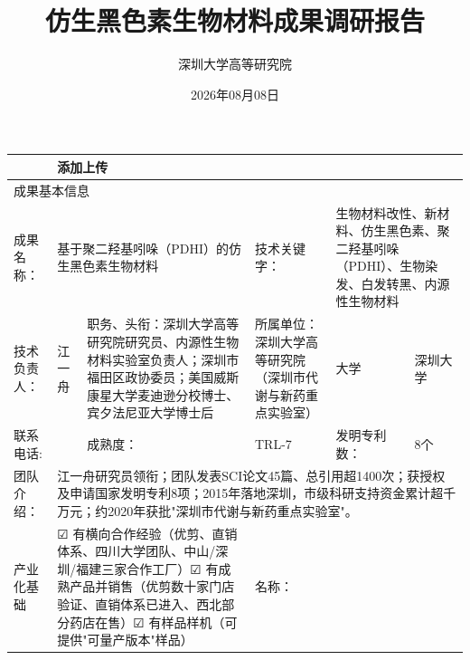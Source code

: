 \documentclass[nomath]{harryopo-paper}
\title{仿生黑色素生物材料成果调研报告}
\author{深圳大学高等研究院}
\date{2026年08月08日}
\begin{document}
\maketitle

\newlength{\cellw}
\setlength{\cellw}{\dimexpr\dimexpr\textwidth-14\tabcolsep-7\arrayrulewidth-1pt\relax/6\relax}
\begin{longtable}{|p{\dimexpr\dimexpr\textwidth-14\tabcolsep-7\arrayrulewidth-1pt\relax/6\relax}|p{\dimexpr\dimexpr\textwidth-14\tabcolsep-7\arrayrulewidth-1pt\relax/6\relax}|p{\dimexpr\dimexpr\textwidth-14\tabcolsep-7\arrayrulewidth-1pt\relax/6\relax}|p{\dimexpr\dimexpr\textwidth-14\tabcolsep-7\arrayrulewidth-1pt\relax/6\relax}|p{\dimexpr\dimexpr\textwidth-14\tabcolsep-7\arrayrulewidth-1pt\relax/6\relax}|p{\dimexpr\dimexpr\textwidth-14\tabcolsep-7\arrayrulewidth-1pt\relax/6\relax}|}
\hline
\endfirsthead
\hline
\endhead
\hline
\endfoot
\hline
\endlastfoot
  \multicolumn{4}{|p{\dimexpr4\cellw+3\arrayrulewidth+6\tabcolsep\relax}|}{上传成果介绍材料【AI自动填写】} & \multicolumn{2}{|p{\dimexpr2\cellw+1\arrayrulewidth+2\tabcolsep\relax}|}{添加上传} \\ \hline
  \multicolumn{6}{|p{\dimexpr6\cellw+5\arrayrulewidth+10\tabcolsep\relax}|}{成果基本信息} \\ \hline
  成果名称： & \multicolumn{2}{|p{\dimexpr2\cellw+1\arrayrulewidth+2\tabcolsep\relax}|}{基于聚二羟基吲哚（PDHI）的仿生黑色素生物材料} & 技术关键 字： & \multicolumn{2}{|p{\dimexpr2\cellw+1\arrayrulewidth+2\tabcolsep\relax}|}{生物材料改性、新材料、仿生黑色素、聚二羟基吲哚（PDHI）、生物染发、白发转黑、内源性生物材料} \\ \hline
  技术负责人： & 江一舟 & 职务、头衔：深圳大学高等研究院研究员、内源性生物材料实验室负责人；深圳市福田区政协委员；美国威斯康星大学麦迪逊分校博士、宾夕法尼亚大学博士后 & 所属单位：深圳大学高等研究院（深圳市代谢与新药重点实验室） & 大学 & 深圳大学 \\ \hline
  联系电话: &  & 成熟度： & TRL-7 & 发明专利数： & 8个 \\ \hline
  团队介绍： & \multicolumn{5}{|p{\dimexpr5\cellw+4\arrayrulewidth+8\tabcolsep\relax}|}{江一舟研究员领衔；团队发表SCI论文45篇、总引用超1400次；获授权及申请国家发明专利8项；2015年落地深圳，市级科研支持资金累计超千万元；约2020年获批"深圳市代谢与新药重点实验室"。} \\ \hline
  产业化基础 & \multicolumn{2}{|p{\dimexpr2\cellw+1\arrayrulewidth+2\tabcolsep\relax}|}{☑ 有横向合作经验（优剪、直销体系、四川大学团队、中山/深圳/福建三家合作工厂）☑ 有成熟产品并销售（优剪数十家门店验证、直销体系已进入、西北部分药店在售）☑ 有样品样机（可提供"可量产版本"样品）} & 名称： & \multicolumn{2}{|p{\dimexpr2\cellw+1\arrayrulewidth+2\tabcolsep\relax}|}{} \\ \hline

\end{longtable}
\end{document}
